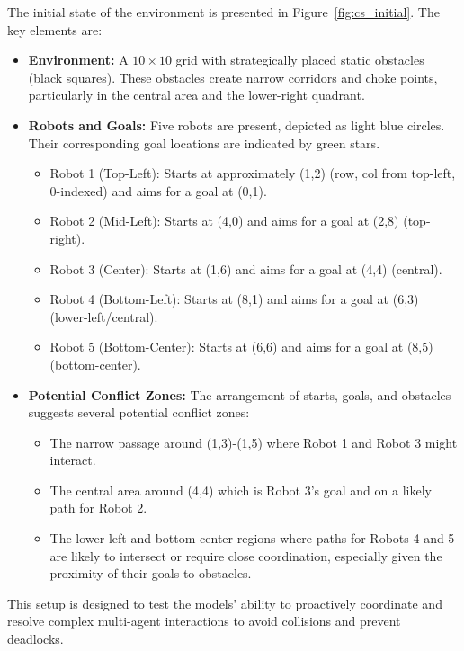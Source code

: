 The initial state of the environment is presented in Figure~\ref{fig:cs_initial}. The key elements are:
\begin{itemize}
    \item \textbf{Environment:} A $10 \times 10$ grid with strategically placed static obstacles (black squares). These obstacles create narrow corridors and choke points, particularly in the central area and the lower-right quadrant.
    \item \textbf{Robots and Goals:} Five robots are present, depicted as light blue circles. Their corresponding goal locations are indicated by green stars.
        \begin{itemize}
            \item Robot 1 (Top-Left): Starts at approximately (1,2) (row, col from top-left, 0-indexed) and aims for a goal at (0,1).
            \item Robot 2 (Mid-Left): Starts at (4,0) and aims for a goal at (2,8) (top-right).
            \item Robot 3 (Center): Starts at (1,6) and aims for a goal at (4,4) (central).
            \item Robot 4 (Bottom-Left): Starts at (8,1) and aims for a goal at (6,3) (lower-left/central).
            \item Robot 5 (Bottom-Center): Starts at (6,6) and aims for a goal at (8,5) (bottom-center).
        \end{itemize}
    \item \textbf{Potential Conflict Zones:} The arrangement of starts, goals, and obstacles suggests several potential conflict zones:
        \begin{itemize}
            \item The narrow passage around (1,3)-(1,5) where Robot 1 and Robot 3 might interact.
            \item The central area around (4,4) which is Robot 3's goal and on a likely path for Robot 2.
            \item The lower-left and bottom-center regions where paths for Robots 4 and 5 are likely to intersect or require close coordination, especially given the proximity of their goals to obstacles.
        \end{itemize}
\end{itemize}
This setup is designed to test the models' ability to proactively coordinate and resolve complex multi-agent interactions to avoid collisions and prevent deadlocks.

